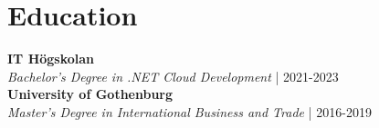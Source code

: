 \documentclass[11pt,a4paper]{article}
\begin{document}
\section*{Education}
\textbf{IT Högskolan}\\
\textit{Bachelor's Degree in .NET Cloud Development} | 2021-2023\\
\textbf{University of Gothenburg}\\
\textit{Master's Degree in International Business and Trade} | 2016-2019\\
\end{document}

